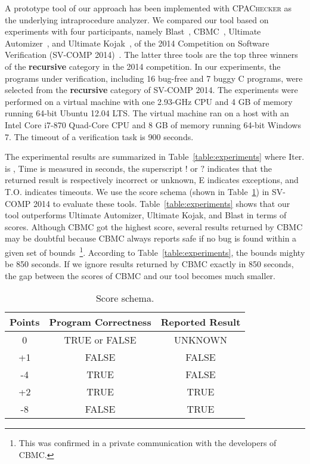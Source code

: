 \newcommand{\safe}{S}
\newcommand{\unsafe}{U}
\newcommand{\unknown}{?}
\newcommand{\exception}{E}
\newcommand{\timeout}{T.O.}
\newcommand{\unknownmark}{\ensuremath{^?}}
\newcommand{\wrongmark}{\ensuremath{^!}}


A prototype tool of our approach has been implemented with
\textsc{CPAChecker} as the underlying intraprocedure analyzer.
We compared our tool based on experiments with four participants,
namely Blast~\cite{BeyerHJM07}, CBMC~\cite{}, Ultimate
Automizer~\cite{HeizmannCDEHLNSP13}, and Ultimate Kojak~\cite{Kojak},
of the 2014 Competition on Software Verification (SV-COMP
2014)~\cite{svcomp14}.
The latter three tools are the top three winners of the
\textbf{recursive} category in the 2014 competition.
In our experiments, the programs under verification, including 16
bug-free and 7 buggy C programs, were selected from the
\textbf{recursive} category of SV-COMP 2014.
The experiments were performed on a virtual machine with one 2.93-GHz 
CPU and 4 GB of memory running 64-bit Ubuntu 12.04 LTS.
The virtual machine ran on a host with an Intel Core i7-870 Quad-Core
CPU and 8 GB of memory running 64-bit Windows 7.
The timeout of a verification task is 900 seconds.

The experimental results are summarized in
Table~\ref{table:experiments} where Iter. is , Time is
measured in seconds, the superscript $!$ or $?$ indicates that the
returned result is respectively incorrect or unknown, E indicates
exceptions, and T.O. indicates timeouts.
We use the score schema (shown in Table~\ref{table:score-schema}) in
SV-COMP 2014 to evaluate these tools.
Table~\ref{table:experiments} shows that our tool outperforms Ultimate
Automizer, Ultimate Kojak, and Blast in terms of scores.
Although CBMC got the highest score, several results returned by CBMC
may be doubtful because CBMC always reports safe if no bug is found
within a given set of bounds~\footnote{This was confirmed in a private
  communication with the developers of CBMC.}.
According to Table~\ref{table:experiments}, the bounds mighty be 850
seconds.
If we ignore results returned by CBMC exactly in 850 seconds, the gap
between the scores of CBMC and our tool becomes much smaller.

\begin{table}
\caption{Score schema.\label{table:score-schema}}
\begin{center}
\begin{tabular}{|c|c|c|}
\hline
Points & Program Correctness & Reported Result \\\hline
0      & TRUE or FALSE & UNKNOWN \\
+1     & FALSE         & FALSE \\
-4     & TRUE          & FALSE \\
+2     & TRUE          & TRUE \\
-8     & FALSE         & TRUE \\\hline
\end{tabular}
\end{center}
\end{table}

